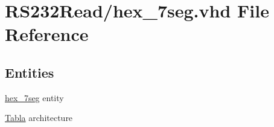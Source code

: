 \hypertarget{hex__7seg_8vhd}{}\section{R\+S232\+Read/hex\+\_\+7seg.vhd File Reference}
\label{hex__7seg_8vhd}
\subsection*{Entities}
\begin{DoxyCompactItemize}
\item 
\hyperlink{classhex__7seg}{hex\+\_\+7seg} entity
\item 
\hyperlink{class_hex__7seg_1_1_tabla}{Tabla} architecture
\end{DoxyCompactItemize}
